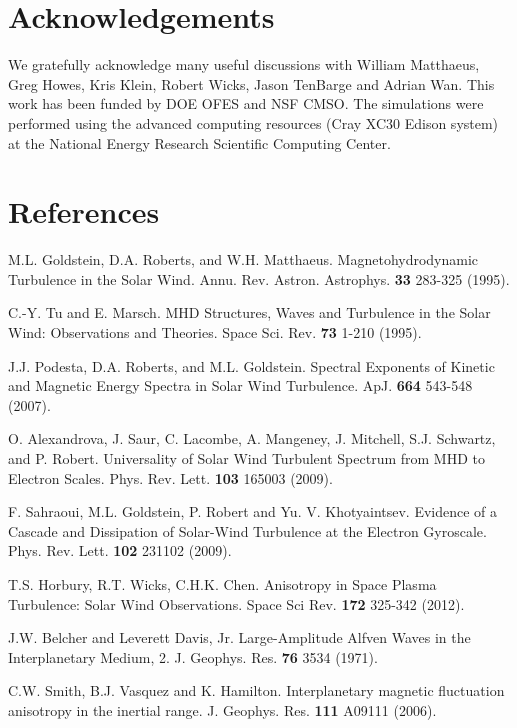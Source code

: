 \documentclass[aip,prl,amsmath,amssymb,reprint,superscriptaddress]{revtex4-1} %
\begin{document}
\section*{Acknowledgements}
  We gratefully acknowledge many useful discussions with William Matthaeus, Greg Howes, Kris Klein, Robert Wicks, Jason TenBarge and Adrian Wan. This work has been funded by DOE OFES and NSF CMSO.  The simulations were performed using the advanced computing resources (Cray XC30 Edison system) at the National Energy Research Scientific Computing Center.
\section*{References}
\begin{thebibliography}{99}

 M.L. Goldstein, D.A. Roberts, and W.H. Matthaeus. Magnetohydrodynamic Turbulence in the Solar Wind. Annu. Rev. Astron. Astrophys. {\bf 33} 283-325 (1995).

 C.-Y. Tu and E. Marsch. MHD Structures, Waves and Turbulence in the Solar Wind: Observations and Theories. Space Sci. Rev. {\bf 73} 1-210 (1995).

 J.J. Podesta, D.A. Roberts, and M.L. Goldstein. Spectral Exponents of Kinetic and Magnetic Energy Spectra in Solar Wind Turbulence. ApJ. {\bf 664} 543-548 (2007).

 O. Alexandrova, J. Saur, C. Lacombe, A. Mangeney, J. Mitchell, S.J. Schwartz, and P. Robert. Universality of Solar Wind Turbulent Spectrum from MHD to Electron Scales. Phys. Rev. Lett. {\bf 103} 165003 (2009).

 F. Sahraoui, M.L. Goldstein, P. Robert and Yu. V. Khotyaintsev. Evidence of a Cascade and Dissipation of Solar-Wind Turbulence at the Electron Gyroscale. Phys. Rev. Lett. {\bf 102} 231102 (2009).

 T.S. Horbury, R.T. Wicks, C.H.K. Chen. Anisotropy in Space Plasma Turbulence: Solar Wind Observations. Space Sci Rev. {\bf 172} 325-342 (2012).

 J.W. Belcher and Leverett Davis, Jr. Large-Amplitude Alfven Waves in the Interplanetary Medium, 2. J. Geophys. Res. {\bf 76} 3534 (1971).

 C.W. Smith, B.J. Vasquez and K. Hamilton. Interplanetary magnetic fluctuation anisotropy in the inertial range. J. Geophys. Res. {\bf 111} A09111 (2006).


\end{thebibliography}
\end{document}
